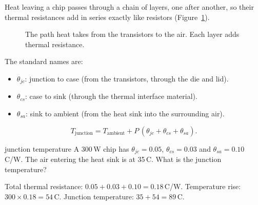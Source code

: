 Heat leaving a chip passes through a chain of layers, one after another, so their thermal resistances add in series exactly like resistors (Figure~\ref{fig:thermalstack}).

\begin{figure}[h]
\centering
{}
\caption{The path heat takes from the transistors to the air. Each layer adds thermal resistance.}
\label{fig:thermalstack}
\end{figure}

The standard names are:
\begin{itemize}
  \item $\theta_{jc}$: junction to case (from the transistors, through the die and lid).
  \item $\theta_{cs}$: case to sink (through the thermal interface material).
  \item $\theta_{sa}$: sink to ambient (from the heat sink into the surrounding air).
\end{itemize}
\[
  T_{\text{junction}} = T_{\text{ambient}} + P\,(\theta_{jc} + \theta_{cs} + \theta_{sa}).
\]

\begin{worked}{junction temperature}
A 300\,W chip has $\theta_{jc} = 0.05$, $\theta_{cs} = 0.03$ and $\theta_{sa} = 0.10$\,\textdegree C/W. The air entering the heat sink is at 35\,\textdegree C. What is the junction temperature?

Total thermal resistance: $0.05 + 0.03 + 0.10 = 0.18$\,\textdegree C/W. Temperature rise: $300 \times 0.18 = 54$\,\textdegree C. Junction temperature: $35 + 54 = 89$\,\textdegree C.
\end{worked}


